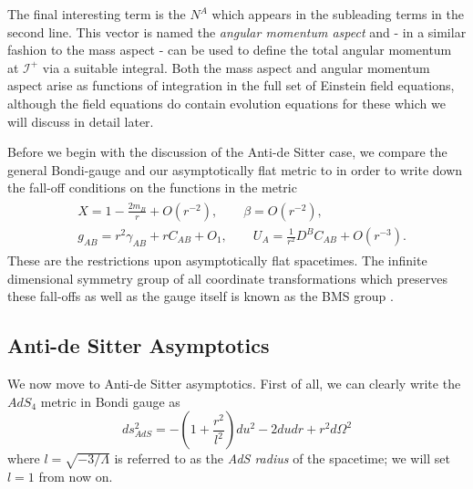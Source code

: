 \documentclass[a4paper,11pt]{article}
\numberwithin{equation}{section}
\begin{document}
The final interesting term is the $N^A$ which appears in the subleading terms in the second line. This vector is named the \textit{angular momentum aspect} and - in a similar fashion to the mass aspect - can be used to define the total angular momentum at $\mathscr{I^+}$ via a suitable integral. Both the mass aspect and angular momentum aspect arise as functions of integration in the full set of Einstein field equations, although the field equations do contain evolution equations for these \cite{Flanagan:2015pxa, Strominger:2013jfa, Pasterski:2015tva, Barnich:2010eb} which we will discuss in detail later.

Before we begin with the discussion of the Anti-de Sitter case, we compare the general Bondi-gauge and our asymptotically flat metric to in order to write down the fall-off conditions on the functions in the metric 
\begin{align}
\begin{split}
&X=1-\frac{2m_B}{r}+O(r^{-2}), \qquad \beta=O(r^{-2}), \\ 
&g_{AB}=r^2\gamma_{AB}+rC_{AB}+O_{1}, \qquad U_A=\frac{1}{r^2}D^{B}C_{AB}+O(r^{-3}).
\end{split}
\end{align}
These are the restrictions upon asymptotically flat spacetimes. The infinite dimensional symmetry group of all coordinate transformations which preserves these fall-offs as well as the gauge itself is known as the BMS group \cite{Sachs:1962zza}.

\subsection{Anti-de Sitter Asymptotics}  \label{subseq: AdS_asymptotics}

We now move to Anti-de Sitter asymptotics. First of all, we can clearly write the $AdS_4$ metric in Bondi gauge as 
\begin{equation}
ds_{AdS}^2=-\left(1+\frac{r^2}{l^2}\right)du^2-2dudr+r^2d\Omega^2
\end{equation}
where $l=\sqrt{-3/\Lambda}$ is referred to as the \textit{AdS radius} of the spacetime; we will set $l=1$ from now on. 
\end{document}

